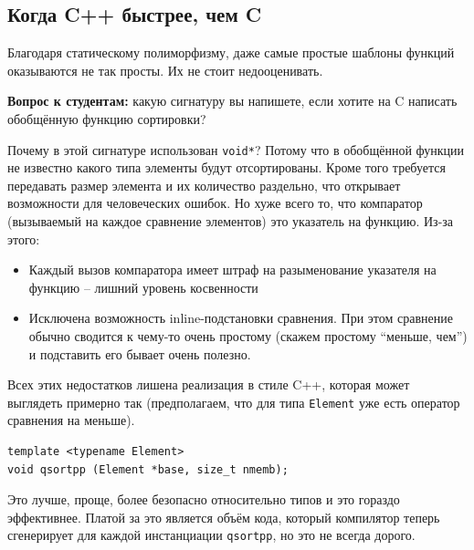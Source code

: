 \documentclass[a4paper,12pt,oneside]{book}
\newif\ifanswers
\begin{document}
\subsection{Когда C++ быстрее, чем C}\label{CppBetterC}

Благодаря статическому полиморфизму, даже самые простые шаблоны функций оказываются не так просты. Их не стоит недооценивать. 

\textbf{Вопрос к студентам:} какую сигнатуру вы напишете, если хотите на C написать обобщённую функцию сортировки? 

\ifanswers
Ответ: стандарт языка C99 регламентирует (пункт 7.20.5.2) следующую сигнатуру:

\begin{lstlisting}
void qsort (void *base, size_t nmemb, size_t size, 
            int (*compar)(const void *, const void *));
\end{lstlisting}
\fi

Почему в этой сигнатуре использован \lstinline!void*!? Потому что в обобщённой функции не известно какого типа элементы будут отсортированы. Кроме того требуется передавать размер элемента и их количество раздельно, что открывает возможности для человеческих ошибок. Но хуже всего то, что компаратор (вызываемый на каждое сравнение элементов) это указатель на функцию. Из-за этого:

\begin{itemize}
\item Каждый вызов компаратора имеет штраф на разыменование указателя на функцию -- лишний уровень косвенности
\item Исключена возможность inline-подстановки сравнения. При этом сравнение обычно сводится к чему-то очень простому (скажем простому ``меньше, чем'') и подставить его бывает очень полезно.
\end{itemize}

Всех этих недостатков лишена реализация в стиле C++, которая может выглядеть примерно так (предполагаем, что для типа \lstinline!Element! уже есть оператор сравнения на меньше).

\begin{lstlisting}
template <typename Element>
void qsortpp (Element *base, size_t nmemb);
\end{lstlisting}

Это лучше, проще, более безопасно относительно типов и это гораздо эффективнее. Платой за это является объём кода, который компилятор теперь сгенерирует для каждой инстанциации \lstinline!qsortpp!, но это не всегда дорого.
\end{document}
